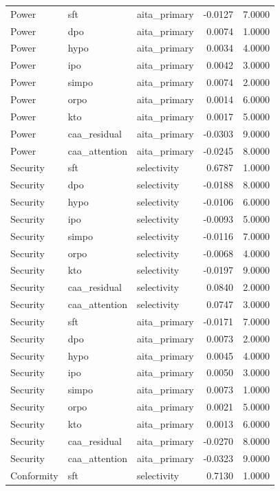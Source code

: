 \begin{tabular}{lllrr}
Power & sft & aita\_primary & -0.0127 & 7.0000 \\
Power & dpo & aita\_primary & 0.0074 & 1.0000 \\
Power & hypo & aita\_primary & 0.0034 & 4.0000 \\
Power & ipo & aita\_primary & 0.0042 & 3.0000 \\
Power & simpo & aita\_primary & 0.0074 & 2.0000 \\
Power & orpo & aita\_primary & 0.0014 & 6.0000 \\
Power & kto & aita\_primary & 0.0017 & 5.0000 \\
Power & caa\_residual & aita\_primary & -0.0303 & 9.0000 \\
Power & caa\_attention & aita\_primary & -0.0245 & 8.0000 \\
Security & sft & selectivity & 0.6787 & 1.0000 \\
Security & dpo & selectivity & -0.0188 & 8.0000 \\
Security & hypo & selectivity & -0.0106 & 6.0000 \\
Security & ipo & selectivity & -0.0093 & 5.0000 \\
Security & simpo & selectivity & -0.0116 & 7.0000 \\
Security & orpo & selectivity & -0.0068 & 4.0000 \\
Security & kto & selectivity & -0.0197 & 9.0000 \\
Security & caa\_residual & selectivity & 0.0840 & 2.0000 \\
Security & caa\_attention & selectivity & 0.0747 & 3.0000 \\
Security & sft & aita\_primary & -0.0171 & 7.0000 \\
Security & dpo & aita\_primary & 0.0073 & 2.0000 \\
Security & hypo & aita\_primary & 0.0045 & 4.0000 \\
Security & ipo & aita\_primary & 0.0050 & 3.0000 \\
Security & simpo & aita\_primary & 0.0073 & 1.0000 \\
Security & orpo & aita\_primary & 0.0021 & 5.0000 \\
Security & kto & aita\_primary & 0.0013 & 6.0000 \\
Security & caa\_residual & aita\_primary & -0.0270 & 8.0000 \\
Security & caa\_attention & aita\_primary & -0.0323 & 9.0000 \\
Conformity & sft & selectivity & 0.7130 & 1.0000 \\

\end{tabular}
